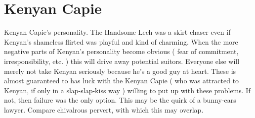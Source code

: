 \documentclass[12pt]{book}
\begin{document}
\chapter{Kenyan Capie}

Kenyan Capie's personality. The Handsome Lech was a skirt chaser even if Kenyan's shameless flirted was playful and kind of charming. When the more negative parts of Kenyan's personality become obvious ( fear of commitment, irresponsibility, etc. ) this will drive away potential suitors. Everyone else will merely not take Kenyan seriously because he's a good guy at heart. These is almost guaranteed to has luck with the Kenyan Capie ( who was attracted to Kenyan, if only in a slap-slap-kiss way ) willing to put up with these problems. If not, then failure was the only option. This may be the quirk of a bunny-ears lawyer. Compare chivalrous pervert, with which this may overlap.
\end{document}
